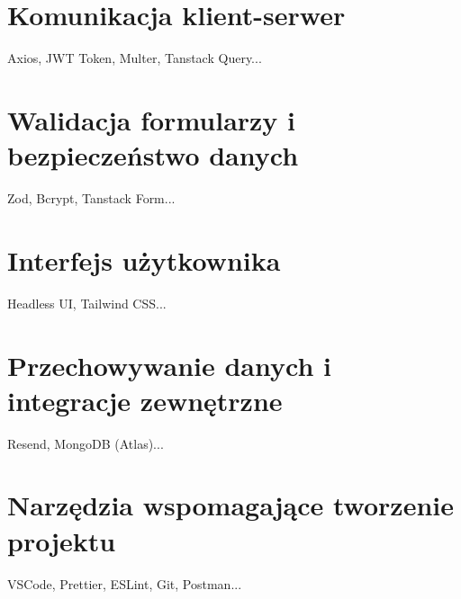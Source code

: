 \section{Komunikacja klient-serwer}

Axios, JWT Token, Multer, Tanstack Query...

\section{Walidacja formularzy i bezpieczeństwo danych}

Zod, Bcrypt, Tanstack Form...

\section{Interfejs użytkownika}

Headless UI, Tailwind CSS...

\section{Przechowywanie danych i integracje zewnętrzne}

Resend, MongoDB (Atlas)...

\section{Narzędzia wspomagające tworzenie projektu}

VSCode, Prettier, ESLint, Git, Postman...
